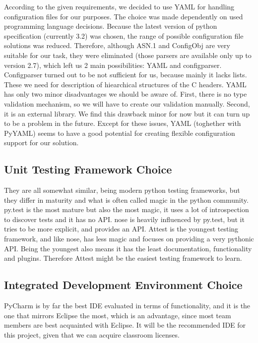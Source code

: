 According to the given requirements, we decided to use YAML for handling
configuration files for our purposes. The choice was made dependently on used
programming language decisions. Because the latest version of python
specification (currently 3.2) was chosen, the range of possible configuration
file solutions was reduced. Therefore, although ASN.1 and ConfigObj are very
suitable for our task, they were eliminated (those parsers are available only
up to version 2.7), which left us 2 main possibilities: YAML and configparser.
Configparser turned out to be not sufficient for us, because mainly it lacks
lists. These we need for description of hiearchical structures of the C
headers. YAML has only two minor disadvantages we should be aware of. First,
there is no type validation mechanism, so we will have to create our validation
manually. Second, it is an external library. We find this drawback minor for
now but it can turn up to be a problem in the future. Except for these issues,
YAML (toghether with PyYAML) seems to have a good potential for creating
flexible configuration support for our solution.

\subsection{Unit Testing Framework Choice}
\label{sec:pre:testchoice}
They are all somewhat similar, being modern python testing frameworks, but they
differ in maturity and what is often called magic in the python community.
py.test is the most mature but also the most magic, it uses a lot of
introspection to discover tests and it has no API. nose is heavily influenced
by py.test, but it tries to be more explicit, and provides an API. Attest is
the youngest testing framework, and like nose, has less magic and focuses on
providing a very pythonic API. Being the youngest also means it has the least
documentation, functionality and plugins. Therefore Attest might be the easiest
testing framework to learn.

\subsection{Integrated Development Environment Choice}
\label{sec:pre:idechoice}
PyCharm is by far the best IDE evaluated in terms of functionality, and it is
the one that mirrors Eclipse the most, which is an advantage, since most team
members are best acquainted with Eclipse. It will be the recommended IDE for
this project, given that we can acquire classroom licenses.

